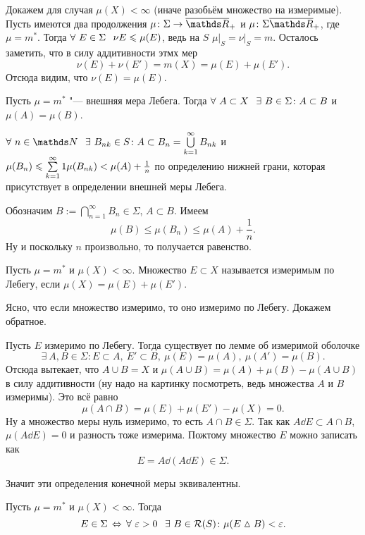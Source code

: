 \begin{Proof}
  Докажем для случая $\mu(X)<\infty$ (иначе разобьём множество на измеримые). Пусть имеются два продолжения $\mu\colon \Sigma\to\ol\R_+$ и $\mu\colon \Sigma\ol\R_+$, где $\mu=m^*$. Тогда $\forall\ E\in\Sigma\pau \nu E\le \mu (E)$, ведь на $S$ $\mu\big|_S=\nu\big|_S=m$. Осталось заметить, что в силу аддитивности этмх мер
\[\nu(E)+\nu(E')=m(X)=\mu(E)+\mu(E').\]
Отсюда видим, что $\nu(E)=\mu(E)$.
\end{Proof}

\begin{Lem}
  Пусть $\mu=m^*$ "--- внешняя мера Лебега. Тогда $\forall\ A\subset X\pau \exists\ B\in\Sigma\colon A\subset B$ и $\mu(A)=\mu(B)$.
\end{Lem}
\begin{Proof}
  $\forall\ n\in\N\pau\exists\ B_{nk}\in S\colon A\subset B_n = \uN k1 B_{nk}$ и 
$  \mu(B_n)\leqslant \sum\limits_{{k}={1}}^\infty1\mu(B_{nk})< \mu(A) + \frac1n$ по определению нижней грани, которая присутствует в определении внешней меры Лебега.

 Обозначим $B:=\bigcap\limits_{n=1}^\infty B_n\in\Sigma$, $A\subset B$. Имеем
 \[\mu(B)\le \mu(B_n)\le \mu(A)+\frac 1n.\]
 Ну и поскольку $n$ произвольно, то получается равенство.
\end{Proof}

\begin{Def}
  Пусть $\mu=m^*$ и $\mu(X)<\infty$. Множество $E\subset X$ называется измеримым по Лебегу, если $\mu(X)=\mu(E)+\mu(E')$.
\end{Def}

Ясно, что если множество измеримо, то оно измеримо по Лебегу. Докажем обратное.
\begin{Proof}
  Пусть $E$ измеримо по Лебегу. Тогда существует по лемме об измеримой оболочке
 \[ \exists\ A,B\in\Sigma\colon E\subset A,\ E'\subset B,\ \mu(E)=\mu(A),\ \mu(A')=\mu (B).\]
 Отсюда вытекает, что $A\cup B=X$ и $\mu(A\cup B)=\mu(A)+\mu(B) - \mu(A\cup B)$ в силу аддитивности (ну надо на картинку посмотреть, ведь множества $A$ и $B$ измеримы). Это всё равно 
\[\mu(A\cap B) = \mu(E)+\mu(E')-\mu(X) = 0.\]
Ну а множество меры нуль измеримо, то есть $A\cap B\in \Sigma$. Так как $A\dd E\subset A\cap B$, $\mu(A\dd E)=0$ и разность тоже измерима. Пожтому множество $E$ можно записать как
\[E = A\dd (A\dd E)\in\Sigma.\]
\end{Proof}

Значит эти определения конечной меры эквивалентны.

\begin{The}
  Пусть $\mu=m^*$ и $\mu(X)<\infty$. Тогда 
\[E\in\Sigma\iff \forall\ \e>0\pau\exists\ B\in\Rim(S)\colon \mu(E\vartriangle B)<\e.\]
\end{The}

